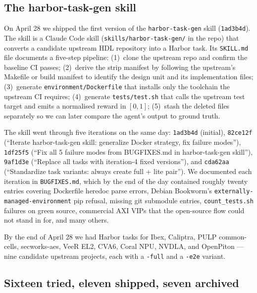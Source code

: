 \documentclass{article}
\begin{document}
\subsection{The harbor-task-gen skill}

On April 28 we shipped the first version of the \texttt{harbor-task-gen} skill
(\texttt{1ad3b4d}). The skill is a Claude Code skill (\texttt{skills/harbor-task-gen/}
in the repo) that converts a candidate upstream HDL repository into a Harbor task. Its
\texttt{SKILL.md} file documents a five-step pipeline:
(1)~clone the upstream repo and confirm the baseline CI passes;
(2)~derive the strip manifest by following the upstream's Makefile or build manifest to
identify the design unit and its implementation files;
(3)~generate \texttt{environment/Dockerfile} that installs only the toolchain the
upstream CI requires;
(4)~generate \texttt{tests/test.sh} that calls the upstream test target and emits a
normalised reward in $[0,1]$;
(5)~stash the deleted files separately so we can later compare the agent's output to
ground truth.

The skill went through five iterations on the same day:
\texttt{1ad3b4d} (initial),
\texttt{82ce12f} (``Iterate harbor-task-gen skill: generalize Docker strategy, fix failure
modes''),
\texttt{1df25f5} (``Fix all 5 failure modes from BUGFIXES.md in harbor-task-gen skill''),
\texttt{9af1d3e} (``Replace all tasks with iteration-4 fixed versions''), and
\texttt{cda62aa} (``Standardize task variants: always create full + lite pair''). We
documented each iteration in \texttt{BUGFIXES.md}, which by the end of the day contained
roughly twenty entries covering Dockerfile heredoc parse errors, Debian Bookworm's
\texttt{externally-managed-environment} pip refusal, missing git submodule entries,
\texttt{count\_tests.sh} failures on green source, commercial AXI VIPs that the open-source
flow could not stand in for, and many others.

By the end of April 28 we had Harbor tasks for Ibex, Caliptra, PULP common-cells,
secworks-aes, VeeR EL2, CVA6, Coral NPU, NVDLA, and OpenPiton --- nine candidate upstream
projects, each with a \texttt{-full} and a \texttt{-e2e} variant.

\subsection{Sixteen tried, eleven shipped, seven archived}
\end{document}
